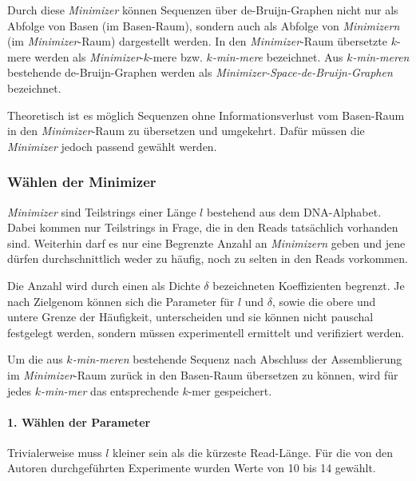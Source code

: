 \documentclass[a4paper, 11pt]{article}
\begin{document}
Durch diese \textit{Minimizer} können Sequenzen über de-Bruijn-Graphen nicht nur als Abfolge von Basen (im Basen-Raum), sondern auch als Abfolge von \textit{Minimizern} (im \textit{Minimizer}-Raum) dargestellt werden. In den \textit{Minimizer}-Raum übersetzte $k$-mere werden als \textit{Minimizer}-$k$-mere bzw. \textit{$k$-min-mere} bezeichnet. Aus \textit{$k$-min-meren} bestehende de-Bruijn-Graphen werden als \textit{Minimizer-Space-de-Bruijn-Graphen} bezeichnet. 

Theoretisch ist es möglich Sequenzen ohne Informationsverlust vom Basen-Raum in den \textit{Minimizer}-Raum zu übersetzen und umgekehrt. Dafür müssen die \textit{Minimizer} jedoch passend gewählt werden. 


\subsubsection{Wählen der Minimizer}
\textit{Minimizer} sind Teilstrings einer Länge $l$ bestehend aus dem DNA-Alphabet. Dabei kommen nur Teilstrings in Frage, die in den Reads tatsächlich vorhanden sind. Weiterhin darf es nur eine Begrenzte Anzahl an \textit{Minimizern} geben und jene dürfen durchschnittlich weder zu häufig, noch zu selten in den Reads vorkommen. 

Die Anzahl wird durch einen als Dichte $\delta$ bezeichneten Koeffizienten begrenzt. Je nach Zielgenom können sich die Parameter für $l$ und $\delta$, sowie die obere und untere Grenze der Häufigkeit, unterscheiden und sie können nicht pauschal festgelegt werden, sondern müssen experimentell ermittelt und verifiziert werden. 

Um die aus \textit{$k$-min-meren} bestehende Sequenz nach Abschluss der Assemblierung im \textit{Minimizer}-Raum zurück in den Basen-Raum übersetzen zu können, wird für jedes \textit{$k$-min-mer} das entsprechende $k$-mer gespeichert. 
\paragraph{1. Wählen der Parameter} Trivialerweise muss $l$ kleiner sein als die kürzeste Read-Länge. Für die von den Autoren durchgeführten Experimente wurden Werte von 10 bis 14 gewählt.
\end{document}
